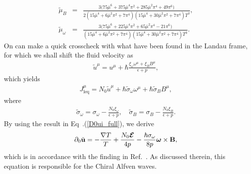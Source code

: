 \documentclass[aps,prd,showkeys,preprint,amsmath,amssymb,nofootinbib]{revtex4-1}
\begin{document}
\begin{eqnarray}\nonumber 
\tilde{\mu}_B&=&\frac{3 \Big(75 \bar{\mu}^6+375 \bar{\mu}^4 \pi ^2+285 \bar{\mu}^2 \pi ^4+49 \pi ^6\Big)}{2 \left(15 \bar{\mu}^4+6 \bar{\mu}^2 \pi ^2+7 \pi ^4\right) \left(15 \bar{\mu}^4+30 \bar{\mu}^2 \pi ^2+7 \pi ^4\right) T^3},
\\
\tilde{\mu}_{\omega}&=&\frac{3 \Big(75 \bar{\mu}^6+225 \bar{\mu}^4 \pi ^2+65 \bar{\mu}^2 \pi ^4-21 \pi ^6\Big)}{\left(15 \bar{\mu}^4+6 \bar{\mu}^2 \pi ^2+7 \pi ^4\right) \left(15 \bar{\mu}^4+30 \bar{\mu}^2 \pi ^2+7 \pi ^4\right) T^3}. \label{UB_UO}
\end{eqnarray}
On can make a quick crosscheck with what have been found in the Landau frame, for which we shall shift the fluid velocity as
\begin{eqnarray}
\tilde{u}^{\mu}=u^{\mu}+\hbar\frac{\xi_{\omega}\omega^{\mu}+\xi_{B}B^{\mu}}{\epsilon+p},
\end{eqnarray}
which yields
\begin{eqnarray}
J_{\text{leq}}^{\mu}=N_0\tilde{u}^{\mu}+\hbar\tilde{\sigma}_{\omega}\omega^{\mu}+\hbar\tilde{\sigma}_{B}B^{\mu},
\end{eqnarray}
where
\begin{eqnarray}
\tilde{\sigma}_{\omega}=\sigma_{\omega}-\frac{N_0\xi_{\omega}}{\epsilon+p},\quad 
\tilde{\sigma}_{B}=\sigma_{B}-\frac{N_0\xi_{B}}{\epsilon+p}.
\end{eqnarray}
By using the result in Eq~.(\ref{D0ui_full}), we derive
	\begin{eqnarray}
	\partial_0\tilde{\bf u}=-\frac{\nabla T}{T}+\frac{N_0\bm{\mathcal{E}}}{4p}-\frac{\hbar \sigma_{\omega}}{8 p}
	\bm{\omega}\times {\bf B},
	\end{eqnarray}
which is in accordance with the finding in Ref.~\cite{Yamamoto:2015ria}. As discussed therein, this equation is responsible for the Chiral Alfven waves. 
\end{document}
